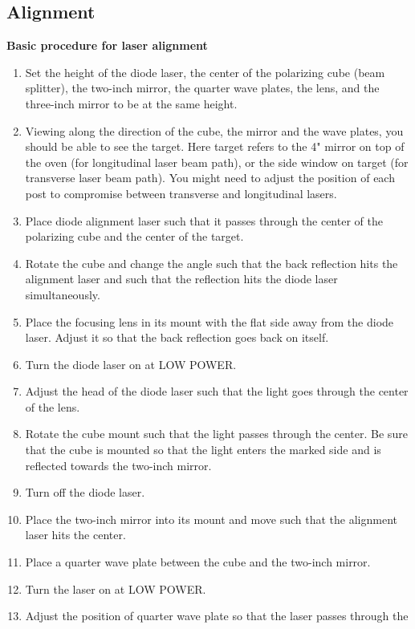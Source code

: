{%
\subsection{Alignment}

\noindent
{\bf{Basic procedure for laser alignment}}


\begin{enumerate} \setlength{\parskip}{0ex}
\item Set the height of the diode laser, the center of the polarizing
  cube (beam splitter), the two-inch mirror, the quarter wave plates, 
  the lens, and the three-inch mirror to be at the same height.
\item Viewing along the direction of the cube, the mirror and the wave 
  plates, you should be able to see the target.  Here target refers to
  the 4" mirror on top of the oven (for longitudinal laser beam path), 
  or the side window on target (for transverse laser beam path).  
  You might need to adjust the position of each post
  to compromise between transverse and longitudinal lasers.
\item Place diode alignment laser such that it passes through the center
  of the polarizing cube and the center of the target.
\item Rotate the cube and change the angle such that the back reflection
  hits the alignment laser and such that the reflection hits the diode
  laser simultaneously.
\item Place the focusing lens in its mount with the flat side away
  from the diode laser. Adjust it so that the back reflection goes back 
  on itself.
\item Turn the diode laser on at LOW POWER.
\item Adjust the head of the diode laser such that the light goes
  through the center of the lens.
\item Rotate the cube mount such that the light passes through the
  center. Be sure that the cube is mounted so that the light enters 
  the marked side and is reflected towards the two-inch mirror.
\item Turn off the diode laser.
\item Place the two-inch mirror into its mount and move such that the
  alignment laser hits the center.
\item Place a quarter wave plate between the cube and the two-inch
  mirror.
\item Turn the laser on at LOW POWER.
\item Adjust the position of quarter wave plate so that the laser passes through the

\end{enumerate}}
